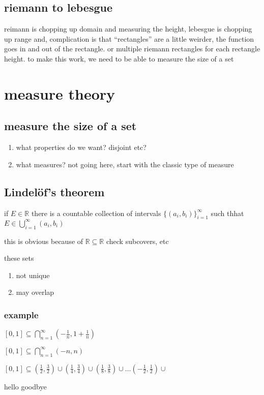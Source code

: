 \documentclass[letterpaper]{article}
\begin{document}
\subsection*{riemann to lebesgue}
reimann is chopping up  domain and measuring the height,
lebesgue is chopping up range and, complication is that ``rectangles'' are a little weirder, the function goes in and out of the rectangle. or multiple riemann rectangles for each rectangle height. to make this work, we need to be able to measure the size of a set

\section*{measure theory}
\subsection*{measure the size of a set}
\begin{enumerate}
\item
what properties do we want? disjoint etc?
\item
what measures? not going here, start with the classic type of measure
\end{enumerate}
\subsection*{Lindelöf's theorem}
if $E\in \mathbb{R}$ there is a countable collection of intervals $\{(a_i,b_i)\}_{i=1}^\infty$ such thhat $E\in \bigcup_{i=1}^\infty(a_i,b_i)$

this is obvious because of $\mathbb{R}\subseteq\mathbb{R}$ check subcovers, etc

these sets
\begin{enumerate}
\item
not unique
\item
may overlap
\end{enumerate}

\subsubsection*{example}
$[0,1]\subseteq\bigcap_{n=1}^\infty(-\frac{1}{n},1+\frac{1}{n})$

$[0,1]\subseteq\bigcap_{n=1}^\infty(-n,n)$

$[0,1]\subseteq(\frac{1}{2},\frac{3}{2})\cup(\frac{1}{4},\frac{3}{4})\cup(\frac{1}{8},\frac{3}{8})\cup\dots(-\frac{1}{2},\frac{1}{2})\cup$

hello goodbye
\end{document}
